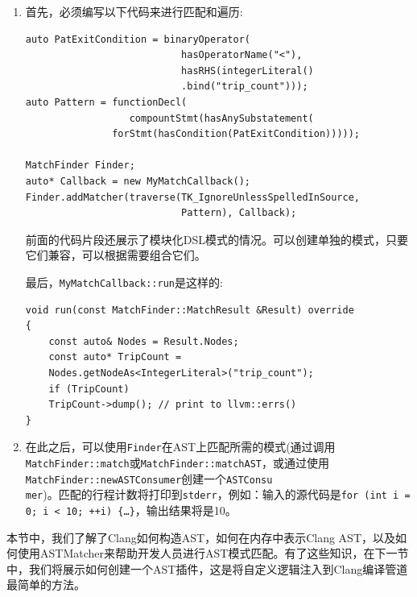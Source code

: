 \begin{enumerate}
\item 首先，必须编写以下代码来进行匹配和遍历:

\begin{lstlisting}[style=styleCXX]
auto PatExitCondition = binaryOperator(
                           hasOperatorName("<"),
                           hasRHS(integerLiteral()
                           .bind("trip_count")));
auto Pattern = functionDecl(
                  compountStmt(hasAnySubstatement(
               forStmt(hasCondition(PatExitCondition)))));
               
MatchFinder Finder;
auto* Callback = new MyMatchCallback();
Finder.addMatcher(traverse(TK_IgnoreUnlessSpelledInSource,
                           Pattern), Callback);
\end{lstlisting}

前面的代码片段还展示了模块化DSL模式的情况。可以创建单独的模式，只要它们兼容，可以根据需要组合它们。

最后，\texttt{MyMatchCallback::run}是这样的:

\begin{lstlisting}[style=styleCXX]
void run(const MatchFinder::MatchResult &Result) override
{
	const auto& Nodes = Result.Nodes;
	const auto* TripCount =
	Nodes.getNodeAs<IntegerLiteral>("trip_count");
	if (TripCount)
	TripCount->dump(); // print to llvm::errs()
}
\end{lstlisting}

\item 在此之后，可以使用\texttt{Finder}在AST上匹配所需的模式(通过调用\texttt{MatchFinder::match}或\texttt{MatchFinder::matchAST}，或通过使用\texttt{MatchFinder::newASTConsumer}创建一个\texttt{ASTConsu\\mer})。匹配的行程计数将打印到\texttt{stderr}，例如：输入的源代码是\texttt{for (int i = 0; i < 10; ++i) \{…\}}，输出结果将是10。
\end{enumerate}

本节中，我们了解了Clang如何构造AST，如何在内存中表示Clang AST，以及如何使用ASTMatcher来帮助开发人员进行AST模式匹配。有了这些知识，在下一节中，我们将展示如何创建一个AST插件，这是将自定义逻辑注入到Clang编译管道最简单的方法。





















